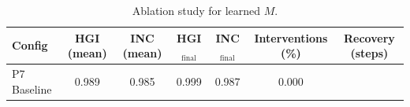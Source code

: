\begin{table}[H]
\centering
\caption{Ablation study for learned $M$.}
\label{tab:p7_ablation}
\begin{tabular}{lcccccc}
\toprule
Config & HGI (mean) & INC (mean) & HGI$_{\text{final}}$ & INC$_{\text{final}}$ & Interventions (\%) & Recovery (steps) \\
\midrule
 P7 Baseline & 0.989 & 0.985 & 0.999 & 0.987 & 0.000 &  \\
\bottomrule
\end{tabular}
\end{table}